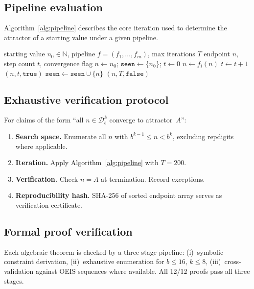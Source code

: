 \documentclass[11pt,a4paper]{amsart}
\theoremstyle{plain}
\theoremstyle{definition}
\theoremstyle{remark}
\begin{document}
\subsection{Pipeline evaluation}

Algorithm~\ref{alg:pipeline} describes the core iteration used to determine
the attractor of a starting value under a given pipeline.

\begin{algorithm}[ht]
\caption{Pipeline orbit computation}\label{alg:pipeline}
\begin{algorithmic}[1]
\Require starting value $n_0 \in \mathbb{N}$, pipeline $f = (f_1, \ldots, f_m)$, max iterations $T$
\Ensure endpoint $n$, step count $t$, convergence flag
\State $n \gets n_0$; $\texttt{seen} \gets \{n_0\}$; $t \gets 0$
    \State $n \gets f_i(n)$
  \EndFor
  \State $t \gets t + 1$
    \State \Return $(n, t, \texttt{true})$
  \EndIf
  \State $\texttt{seen} \gets \texttt{seen} \cup \{n\}$
\EndWhile
\State \Return $(n, T, \texttt{false})$
\end{algorithmic}
\end{algorithm}

\subsection{Exhaustive verification protocol}

For claims of the form ``all $n \in \mathcal{D}_b^k$ converge to attractor~$A$'':

\begin{enumerate}
\item \textbf{Search space.} Enumerate all $n$ with $b^{k-1} \leq n < b^k$,
  excluding repdigits where applicable.
\item \textbf{Iteration.} Apply Algorithm~\ref{alg:pipeline} with $T = 200$.
\item \textbf{Verification.} Check $n = A$ at termination. Record exceptions.
\item \textbf{Reproducibility hash.} SHA-256 of sorted endpoint array serves
  as verification certificate.
\end{enumerate}

\subsection{Formal proof verification}

Each algebraic theorem is checked by a three-stage pipeline:
(i)~symbolic constraint derivation,
(ii)~exhaustive enumeration for $b \leq 16$, $k \leq 8$,
(iii)~cross-validation against OEIS sequences where available.
All 12/12 proofs pass all three stages.
\end{document}
